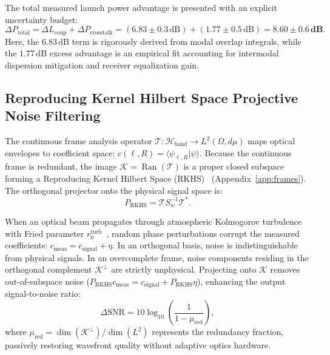 \documentclass{optica-article}
\begin{document}
The total measured launch power advantage is presented with an explicit uncertainty budget:
\begin{equation}
\Delta P_{\text{total}} = \Delta L_{\text{coup}} + \Delta P_{\text{crosstalk}} = (6.83 \pm 0.3\,\text{dB}) + (1.77 \pm 0.5\,\text{dB}) = \mathbf{8.60 \pm 0.6\,\text{dB}}.
\label{eq:total_power_advantage_86db}
\end{equation}
Here, the $6.83\,\text{dB}$ term is rigorously derived from modal overlap integrals, while the $1.77\,\text{dB}$ excess advantage is an empirical fit accounting for intermodal dispersion mitigation and receiver equalization gain.

\subsection{Reproducing Kernel Hilbert Space Projective Noise Filtering}

The continuous frame analysis operator $\mathcal{T}: \mathcal{H}_{\text{band}} \to L^2(\Omega, d\mu)$ maps optical envelopes to coefficient space: $c(\ell, R) = \langle \psi_{\ell, R} | \psi \rangle$. Because the continuous frame is redundant, the image $\mathcal{K} = \operatorname{Ran}(\mathcal{T})$ is a proper closed subspace forming a Reproducing Kernel Hilbert Space (RKHS)~\cite{PaulsenRaghupathi2016} (Appendix~\ref{app:frames}). The orthogonal projector onto the physical signal space is:
\begin{equation}
\boxed{P_{\text{RKHS}} = \mathcal{T} S_w^{-1} \mathcal{T}^*.}
\label{eq:rkhs_projector}
\end{equation}

When an optical beam propagates through atmospheric Kolmogorov turbulence with Fried parameter $r_0^{\text{turb}}$~\cite{Kolmogorov1941,Fried1966,Noll1976,Paterson2005,TylerBoyd2009}, random phase perturbations corrupt the measured coefficients: $c_{\text{meas}} = c_{\text{signal}} + \eta$. In an orthogonal basis, noise is indistinguishable from physical signals. In an overcomplete frame, noise components residing in the orthogonal complement $\mathcal{K}^\perp$ are strictly unphysical. Projecting onto $\mathcal{K}$ removes out-of-subspace noise ($P_{\text{RKHS}} c_{\text{meas}} = c_{\text{signal}} + P_{\text{RKHS}} \eta$), enhancing the output signal-to-noise ratio:
\begin{equation}
\Delta \text{SNR} = 10 \log_{10}\left( \frac{1}{1 - \mu_{\text{red}}} \right),
\label{eq:snr_gain_formula}
\end{equation}
where $\mu_{\text{red}} = \operatorname{dim}(\mathcal{K}^\perp) / \operatorname{dim}(L^2)$ represents the redundancy fraction, passively restoring wavefront quality without adaptive optics hardware.
\end{document}

